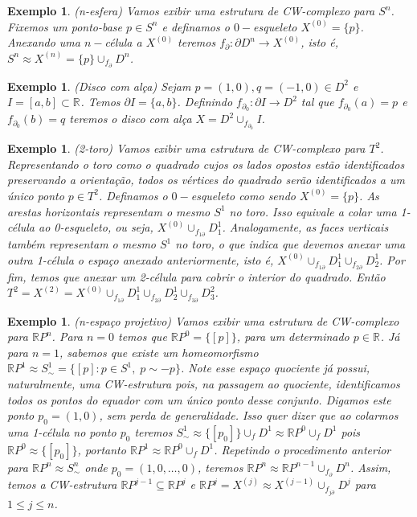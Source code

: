 \documentclass[12pt]{book}
\newtheorem{exemplo}[teorema]{Exemplo}
\newcommand{\celula}[2]{D^{#1}_{#2}}
\newcommand{\classe}[1]{[#1]}
\newcommand{\real}[1]{\mathbb{R}^{#1}}
\newcommand{\realprojetivo}[1]{\mathbb{R}P^{#1}}
\newcommand{\reta}{\real{}}
\newcommand{\skeleton}[1]{X^{(#1)}}
\begin{document}
	\begin{exemplo}
		(n-esfera) Vamos exibir uma estrutura de CW-complexo para $S^{n}$. Fixemos um ponto-base $p \in S^{n}$ e definamos o $0-$esqueleto $\skeleton{0}=\{p\}$. Anexando uma $n-$célula a $\skeleton{0}$ teremos $f_{\partial}: \partial D^{n} \to \skeleton{0}$, isto é, $S^{n} \approx \skeleton{n} = \{p\}\cup_{f_{\partial}} \celula{n}{}$.
	\end{exemplo}
	
	\begin{exemplo}
		(Disco com alça) Sejam $p=(1,0), q=(-1,0) \in D^{2}$ e $I=[a,b] \subset \reta$. Temos $\partial I=\{a,b\}$. Definindo $f_{\partial_{0}}: \partial I \to D^{2}$ tal que $f_{\partial_{0}}(a)=p$ e $f_{\partial_{0}}(b)=q$ teremos o disco com alça $X=D^{2}\cup_{f_{\partial_{0}}}I$.   
	\end{exemplo}
	
	\begin{exemplo}
		(2-toro) Vamos exibir uma estrutura de CW-complexo para $T^{2}$. Representando o toro como o quadrado cujos os lados opostos estão identificados preservando a orientação, todos os vértices do quadrado serão identificados a um único ponto $p \in T^{2}$. Definamos o $0-$esqueleto como sendo $\skeleton{0} = \{p\}$. As arestas horizontais representam o mesmo $S^{1}$ no toro. Isso equivale a colar uma 1-célula ao 0-esqueleto, ou seja, $\skeleton{0}\cup_{f_{1\partial}}\celula{1}{1}$. Analogamente, as faces verticais também representam o mesmo $S^{1}$ no toro, o que indica que devemos anexar uma outra 1-célula o espaço anexado anteriormente, isto é, $\skeleton{0}\cup_{f_{1\partial}}\celula{1}{1}\cup_{f_{2\partial}}\celula{1}{2}$. Por fim, temos que anexar um 2-célula para cobrir o interior do quadrado. Então $T^{2} =\skeleton{2} = \skeleton{0}\cup_{f_{1\partial}}\celula{1}{1}\cup_{f_{2\partial}}\celula{1}{2}\cup_{f_{3\partial}}\celula{2}{3}$.
	\end{exemplo}
	
	\begin{exemplo}
		(n-espaço projetivo) Vamos exibir uma estrutura de CW-complexo para $\realprojetivo{n}$. Para $n=0$ temos que $\realprojetivo{0} = \{\classe{p}\}$, para um determinado $p \in \real{}$. Já para $n=1$, sabemos que existe um homeomorfismo $\realprojetivo{1} \approx S^{1}_{\sim} = \{\classe{p}: p \in S^{1},\; p \sim -p\}$. Note esse espaço quociente já possui, naturalmente, uma CW-estrutura pois, na passagem ao quociente, identificamos todos os pontos do equador com um único ponto desse conjunto. Digamos este ponto $p_{0} = (1,0)$, sem perda de generalidade. Isso quer dizer que ao colarmos uma 1-célula no ponto $p_{0}$ teremos $S^{1}_{\sim} \approx \{[p_{0}]\} \cup_{f}D^{1} \approx \realprojetivo{0}\cup_{f}D^{1} $ pois $\realprojetivo{0} \approx \{[p_{0}]\}$, portanto $ \realprojetivo{1} \approx \realprojetivo{0}\cup_{f}D^{1}$. Repetindo o procedimento anterior para $\realprojetivo{n} \approx S^{n}_{\sim} $ onde $p_{0} = (1,0,\dots, 0)$, teremos $\realprojetivo{n} \approx \realprojetivo{n-1} \cup_{f_{\partial}}D^{n}$. Assim, temos a CW-estrutura $\realprojetivo{j-1} \subseteq \realprojetivo{j}$ e $\realprojetivo{j} = \skeleton{j} \approx \skeleton{j-1}\cup_{f_{j\partial}}D^{j}$ para $1\leq j \leq n$.
	\end{exemplo}
	
\end{document}
